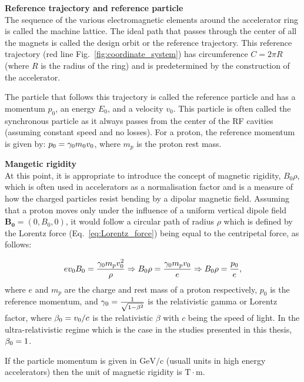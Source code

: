 \textbf{Reference trajectory and reference particle}\\
The sequence of the various electromagnetic elements around the accelerator ring is called the machine lattice. The ideal path that passes through the center of all the magnets is called the design orbit or the reference trajectory. This reference trajectory (red line Fig.~\ref{fig:coordinate_system}) has circumference $C=2\pi R$ (where $R$ is the radius of the ring) and is predetermined by the construction of the accelerator. 

The particle that follows this trajectory is called the reference particle and has a momentum $p_0$, an energy $E_0$, and a velocity $v_0$. This particle is often called the synchronous particle as it always passes from the center of the RF cavities (assuming constant speed and no losses). %
For a proton, the reference momentum is given by: $p_0 = {\gamma_0} m_0 v_0$, where $m_p$ is the proton rest mass.

\textbf{Mangetic rigidity}\\
At this point, it is appropriate to introduce the concept of magnetic rigidity, $B_0 \rho$, which is often used in accelerators as a normalisation factor and is a measure of how the charged particles resist bending by a dipolar magnetic field. Assuming that a proton moves only under the influence of a uniform vertical dipole field $\mathbf{B_0}=(0, B_0, 0)$, it would follow a circular path of radius $\rho$ which is defined by the Lorentz force (Eq.~\eqref{eq:Lorentz_force}) being equal to the centripetal force, as follows:

\begin{equation}\label{eq:Brho}
    e v_0 B_0 = \frac{{\gamma_0} m_p v_0^2}{\rho} \Rightarrow B_0 \rho = \frac{\gamma_0 m_p v_0}{e} \Rightarrow B_0 \rho = \frac{p_0}{e},
\end{equation}
where $e$ and $m_p$ are the charge and rest mass of a proton respectively, $p_0$ is the reference momentum, and ${\gamma_0} = \frac{1}{\sqrt{1-\beta^2}}$ is the relativistic gamma or Lorentz factor, where ${\beta_0}=v_0/c$ is the relativistic $\beta$ with $c$ being the speed of light. In the ultra-relativistic regime which is the case in the studies presented in this thesis, ${\beta_0}=1$.

If the particle momentum is given in $\mathrm{GeV /c}$ (usuall units in high energy accelerators) then the unit of magnetic rigidity is $\mathrm{T \cdot m}$. 

